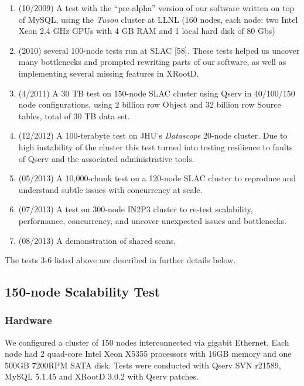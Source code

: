 \documentclass[DM,lsstdraft,toc]{lsstdoc}
\begin{document}
\begin{enumerate}
\def\labelenumi{\arabic{enumi}.}
\item
  (10/2009) A test with the ``pre-alpha'' version of our software
  written on top of MySQL, using the \emph{Tuson} cluster at LLNL (160
  nodes, each node: two Intel Xeon 2.4 GHz GPUs with 4 GB RAM and 1
  local hard disk of 80 Gbs)
\item
  (2010) several 100-node tests run at SLAC {[}58{]}. These tests helped
  us uncover many bottlenecks and prompted rewriting parts of our
  software, as well as implementing several missing features in
  XRootD.
\item
  (4/2011) A 30 TB test on 150-node SLAC cluster using Qserv in
  40/100/150 node configurations, using 2 billion row Object and 32
  billion row Source tables, total of 30 TB data set.
\item
  (12/2012) A 100-terabyte test on JHU's \emph{Datascope} 20-node
  cluster. Due to high instability of the cluster this test turned into
  testing resilience to faults of Qserv and the associated
  administrative tools.
\item
  (05/2013) A 10,000-chunk test on a 120-node SLAC cluster to reproduce
  and understand subtle issues with concurrency at scale.
\item
  (07/2013) A test on 300-node IN2P3 cluster to re-test scalability,
  performance, concurrency, and uncover unexpected issues and
  bottlenecks.
\item
  (08/2013) A demonstration of shared scans.
\end{enumerate}

The tests 3-6 listed above are described in further details below.

\subsection{150-node Scalability Test}\label{node-scalability-test}

\subsubsection{Hardware}\label{hardware}

We configured a cluster of 150 nodes interconnected via gigabit
Ethernet. Each node had 2 quad-core Intel Xeon X5355 processors with
16GB memory and one 500GB 7200RPM SATA disk. Tests were conducted with
Qserv SVN r21589, MySQL 5.1.45 and XRootD
3.0.2 with Qserv patches.
\end{document}
